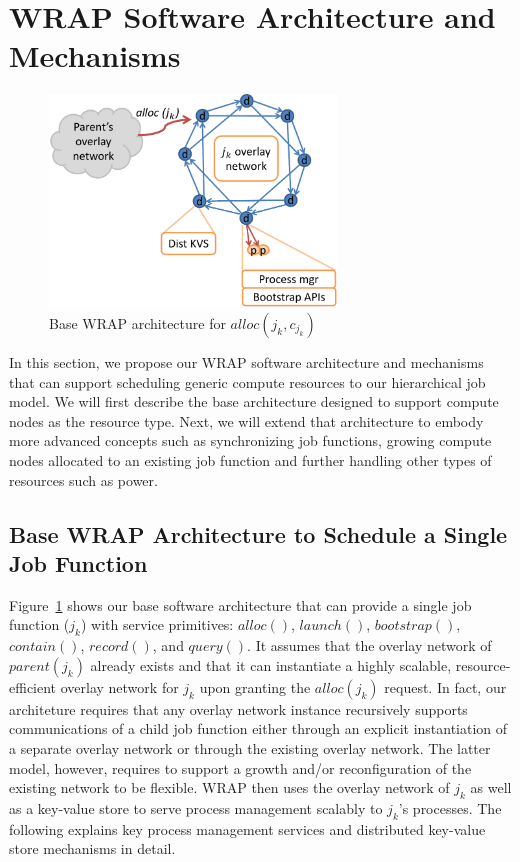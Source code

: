 \documentclass[10pt]{article}
\begin{document}
\section{WRAP Software Architecture and Mechanisms}
\label{sect:arch}
\begin{figure}
  \centering
    \includegraphics[width=3.0in]{fig/WRAP_Base}
  \caption{Base WRAP architecture for $alloc(j_k, c_{j_k})$}
  \label{fig:base}
\end{figure}
In this section, we propose our WRAP software architecture and mechanisms
that can support scheduling generic compute resources to our hierarchical job
model. We will first describe the base architecture designed to support 
compute nodes as the resource type. Next, we will extend that architecture 
to embody more advanced concepts such as synchronizing job functions, 
growing compute nodes allocated to an existing job function and further handling  
other types of resources such as power.

\subsection{Base WRAP Architecture to Schedule a Single Job Function}
Figure~\ref{fig:base} shows our base software architecture 
that can provide a single job function ($j_k$) with service primitives: 
$alloc()$, 
$launch()$, 
$bootstrap()$,
$contain()$,
$record()$, and 
$query()$.
It assumes that the overlay network of $parent(j_k)$
already exists and that it can instantiate a highly scalable,
resource-efficient overlay network for $j_k$ upon 
granting the $alloc(j_k)$ request. In fact, our architeture 
requires that any overlay network instance recursively 
supports communications of a child job function either 
through an explicit instantiation of a separate overlay network
or through the existing overlay network. The latter model, 
however, requires to support a growth and/or reconfiguration 
of the existing network to be flexible.
WRAP then uses the overlay network of $j_k$ as well as 
a key-value store to serve process management scalably
to $j_k$'s processes.
The following explains key process management services 
and distributed key-value store mechanisms in detail. 
\end{document}
